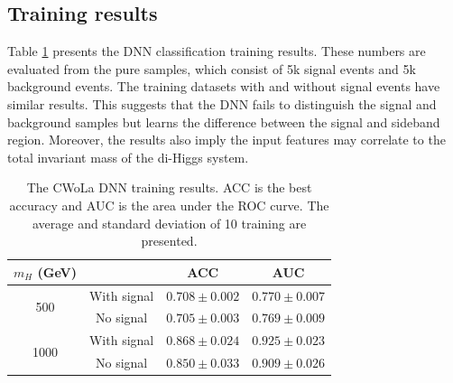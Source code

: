 \documentclass[12pt]{article}
\begin{document}
	\subsection{Training results}%
	\label{sub:training_results}
		Table \ref{tab:cwola_hunting_DNN_results} presents the DNN classification training results. These numbers are evaluated from the pure samples, which consist of 5k signal events and 5k background events. The training datasets with and without signal events have similar results. This suggests that the DNN fails to distinguish the signal and background samples but learns the difference between the signal and sideband region. Moreover, the results also imply the input features may correlate to the total invariant mass of the di-Higgs system.
		\begin{table}[htpb]
			\centering
			\caption{The CWoLa DNN training results. ACC is the best accuracy and AUC is the area under the ROC curve. The average and standard deviation of 10 training are presented.}
			\label{tab:cwola_hunting_DNN_results}
			\begin{tabular}{c|c|cc}
				$m_H$ (GeV)           &             & ACC               & AUC               \\ \hline
				\multirow{2}{*}{500}  & With signal & $0.708 \pm 0.002$ & $0.770 \pm 0.007$ \\
									  & No signal   & $0.705 \pm 0.003$ & $0.769 \pm 0.009$ \\ \hline
				\multirow{2}{*}{1000} & With signal & $0.868 \pm 0.024$ & $0.925 \pm 0.023$ \\
									  & No signal   & $0.850 \pm 0.033$ & $0.909 \pm 0.026$
			\end{tabular}
		\end{table}
\end{document}
